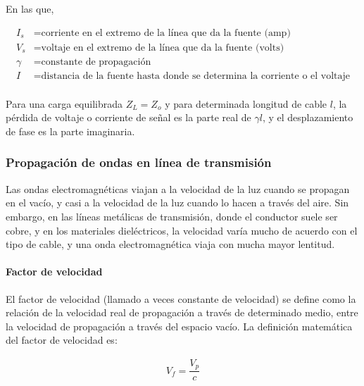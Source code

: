 \begin{itemize}
                En las que, 

                \begin{align*}
                    I_s&= \text{corriente en el extremo de la línea que da la fuente (amp)} \\[0.2cm]
                    V_s&= \text{voltaje en el extremo de la línea que da la fuente (volts)} \\[0.2cm]
                    \gamma&= \text{constante de propagación} \\[0.2cm]
                    I&= \text{distancia de la fuente hasta donde se determina la corriente o el voltaje} \\[0.2cm]
                \end{align*}

                Para una carga equilibrada $Z_L=Z_o$ y para determinada longitud de cable $l$, la pérdida de voltaje o corriente de señal es la parte real de $\gamma l$, y el desplazamiento de fase es la parte imaginaria. 

                
            \end{itemize}

        \subsubsection{Propagación de ondas en línea de transmisión}

            Las ondas electromagnéticas viajan a la velocidad de la luz cuando se propagan en el vacío, y casi a la velocidad de la luz cuando lo hacen a través del aire. Sin embargo, en las líneas metálicas de transmisión, donde el conductor suele ser cobre, y en los materiales dieléctricos, la velocidad varía mucho de acuerdo con el tipo de cable, y una onda electromagnética viaja con mucha mayor lentitud.

            \paragraph{Factor de velocidad}

                El factor de velocidad (llamado a veces constante de velocidad) se define como la relación de la velocidad real de propagación a través de determinado medio, entre la velocidad de propagación a través del espacio vacío. La definición matemática del factor de velocidad es:

                \begin{gather}
                    V_f=\dfrac{V_p}{c} \label{eq:factor_velocidad}  
                \end{gather}

